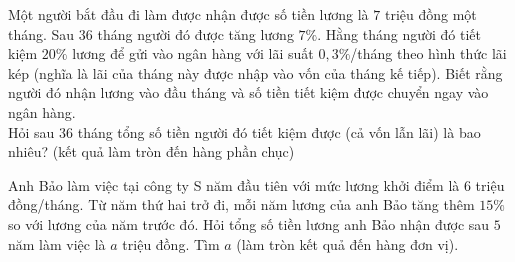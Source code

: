 \begin{ex}%
	Một người bắt đầu đi làm được nhận được số tiền lương là $7$ triệu đồng một tháng. Sau $36$ tháng người đó được tăng lương  $7\%$. Hằng tháng người đó tiết kiệm $20 \%$ lương để gửi vào ngân hàng với lãi suất $0,3\%$/tháng theo hình thức lãi kép (nghĩa là lãi của tháng này được nhập vào vốn của tháng kế tiếp). Biết rằng người đó nhận lương vào đầu tháng và số tiền tiết kiệm được chuyển ngay vào ngân hàng.\\
	Hỏi sau $36$ tháng tổng số tiền người đó tiết kiệm được (cả vốn lẫn lãi) là bao nhiêu? (kết quả làm tròn đến hàng phần  chục)
\end{ex}

\begin{ex}%
	Anh Bảo làm việc tại công ty S năm đầu tiên với mức lương khởi điểm là $6$ triệu đồng/tháng. Từ năm thứ hai trở đi, mỗi năm lương của anh Bảo tăng thêm $15\%$ so với lương của năm trước  đó. Hỏi tổng số tiền lương anh Bảo nhận được sau $5$ năm làm việc là $a$ triệu đồng. Tìm $a$ (làm tròn kết quả đến hàng đơn vị).
\end{ex}

